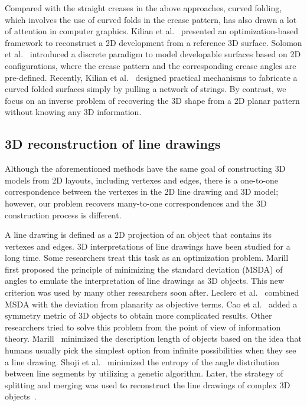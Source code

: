  
Compared with the straight creases in the above approaches, curved folding, which involves the use of curved folds in the crease pattern, has also drawn a lot of attention in computer graphics.  %
 Kilian et al.~\cite{Kilian:2008:CF:1360612.1360674} presented an optimization-based framework to reconstruct a 2D development from a reference 3D surface.
 Solomon et al.~\cite{Solomon:2012:FDS:2346796.2346817} introduced a discrete paradigm to model developable surfaces based on 2D configurations, where the crease pattern and the corresponding crease angles are pre-defined.
Recently, Kilian et al.~\cite{Kilian:2017:SAC:3087678.3015460} designed practical mechanisms to fabricate a curved folded surfaces simply by pulling a network of strings. 
%
By contrast, we focus on an inverse problem of recovering the 3D shape from a 2D planar pattern without knowing any 3D information.





\subsection{3D reconstruction of line drawings}
Although the aforementioned methods have the same goal of constructing 3D models from 2D layouts, including vertexes and edges, there is a one-to-one correspondence between the vertexes in the 2D line drawing and 3D model; however, our problem recovers many-to-one correspondences and the 3D construction process is different.

A line drawing is defined as a 2D projection of an object that contains its vertexes and edges. 3D interpretations of line drawings have been studied for a long time. 
Some researchers treat this task as an optimization problem. 
Marill~\cite{Marill:1991:EHI:113057.113061} first proposed the principle of minimizing the standard deviation (MSDA) of angles to emulate the interpretation of line drawings as 3D objects. 
%
This new criterion was used by many other researchers soon after. 
Leclerc et al.~\cite{Leclerc1992An} combined MSDA with the deviation from planarity as objective terms. 
Cao et al.~\cite{Cao:2005:ORS:1097114.1097658} added a symmetry metric of 3D objects to obtain more complicated results. 
Other researchers tried to solve this problem from the point of view of information theory.
%
Marill~\cite{Marill1992Why} minimized the description length of objects based on the idea that humans usually pick the simplest option from infinite possibilities when they see a line drawing. 
Shoji et al.~\cite{Shoji20013} minimized the entropy of the angle distribution between line segments by utilizing a genetic algorithm. 
Later, the strategy of splitting and merging was used to reconstruct the line drawings of complex 3D objects~\cite{10.1109/TPAMI.2010.49,10.1109/CVPR.2014.94}.   
		 

